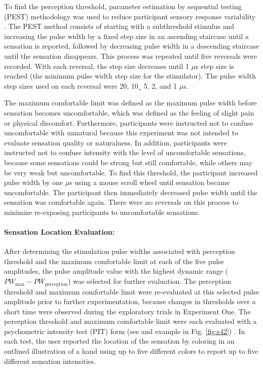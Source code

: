 \documentclass[10pt]{iopart}
\begin{document}
To find the perception threshold, parameter estimation by sequential testing (PEST) methodology was used to reduce participant sensory response variability \cite{slopsema_natural_2018, forst_surface_2015}. The PEST method consists of starting with a subthreshold stimulus and increasing the pulse width by a fixed step size in an ascending staircase until a sensation is reported, followed by decreasing pulse width in a descending staircase until the sensation disappears. This process was repeated until five reversals were recorded. With each reversal, the step size decreases until 1 $\mu$s step size is reached (the minimum pulse width step size for the stimulator). The pulse width step sizes used on each reversal were 20, 10¸ 5, 2, and 1 $\mu$s.

The maximum comfortable limit was defined as the maximum pulse width before sensation becomes uncomfortable, which was defined as the feeling of slight pain or physical discomfort. Furthermore, participants were instructed not to confuse uncomfortable with unnatural because this experiment was not intended to evaluate sensation quality or naturalness. In addition, participants were instructed not to confuse intensity with the level of uncomfortable sensations, because some sensations could be strong but still comfortable, while others may be very weak but uncomfortable. To find this threshold, the participant increased pulse width by one $\mu$s using a mouse scroll wheel until sensation became uncomfortable. The participant then immediately decreased pulse width until the sensation was comfortable again. There were no reversals on this process to minimize re-exposing participants to uncomfortable sensations. 

\paragraph{Sensation Location Evaluation:} After determining the stimulation pulse widths associated with perception threshold and the maximum comfortable limit at each of the five pulse amplitudes, the pulse amplitude value with the highest dynamic range ($PW_{\textrm{max}} - PW_{\textrm{perception}}$) was selected for further evaluation. The perception threshold and maximum comfortable limit were re-evaluated at this selected pulse amplitude prior to further experimentation, because changes in thresholds over a short time were observed during the exploratory trials in Experiment One. The perception threshold and maximum comfortable limit were each evaluated with a psychometric intensity test (PIT) form (see and example in Fig. \ref{fig:s42}) \cite{tan_neural_2014}. In each test, the user reported the location of the sensation by coloring in an outlined illustration of a hand using up to five different colors to report up to five different sensation intensities.
\end{document}
